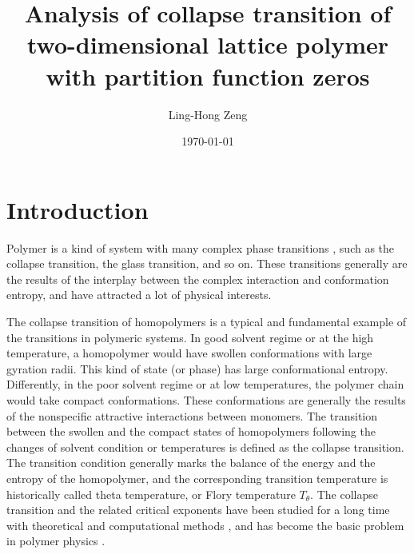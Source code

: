 \documentclass[preprint,preprintnumbers,amsmath,amssymb,showpacs,aps,pre]{revtex4-1}
\begin{document}
\title{Analysis of collapse transition of two-dimensional lattice
polymer with partition function zeros}
\author{Ling-Hong Zeng}


\date{\today}

\begin{abstract}

\end{abstract}


\maketitle

\section{Introduction}

Polymer is a kind of system with many complex phase transitions
\cite{LifshitzRMP78}, such as the collapse transition\cite{FloryJCP49,
FloryBOOK67,WilliamsARPC81}, the glass transition\cite{GibbsJCP58,JackleRPP86}, and
so on. These transitions generally are the results of the interplay
between the complex interaction and conformation entropy, and have
attracted a lot of physical interests\cite{LifshitzRMP78,FloryJCP49,
FloryBOOK67,WilliamsARPC81,GibbsJCP58,JackleRPP86,deGennesBook79,
StephenPLA75,RigByJCP1987,BellRMP93,ChengARMR,PrivmanBook81,ZivPCCP09,
ChengBook08}.

The collapse transition of homopolymers is a typical and fundamental
example of the transitions in polymeric systems\cite{LifshitzRMP78,
FloryBOOK67,deGennesBook79,ZivPCCP09,ChengBook08}. In good solvent
regime or at the high temperature, a homopolymer would have swollen
conformations with large gyration radii. This kind of state (or phase)
has large conformational entropy. Differently, in the poor solvent
regime or at low temperatures, the polymer chain would take compact
conformations. These conformations are generally the results of the
nonspecific attractive interactions between monomers. The transition
between the swollen and the compact states of homopolymers following
the changes of solvent condition or temperatures is defined as the
collapse transition. The transition condition generally marks the
balance of the energy and the entropy of the homopolymer, and the
corresponding transition temperature is historically called theta
temperature, or Flory temperature $T_{\theta}$\cite{FloryJCP49}.
The collapse transition and the related critical exponents have been
studied for a long time with theoretical and computational methods
\cite{deGennesBook79,PrivmanBook81,ZivPCCP09,SaleurJSP86,
DuplantierPRL87,StanleyPRB89,BinderBook95,OYJCP08,CaparicaCPC09,
BinderBook10}, and has become the basic problem in polymer physics
\cite{LifshitzRMP78,deGennesBook79,ZivPCCP09,ChengBook08}.
\end{document}
